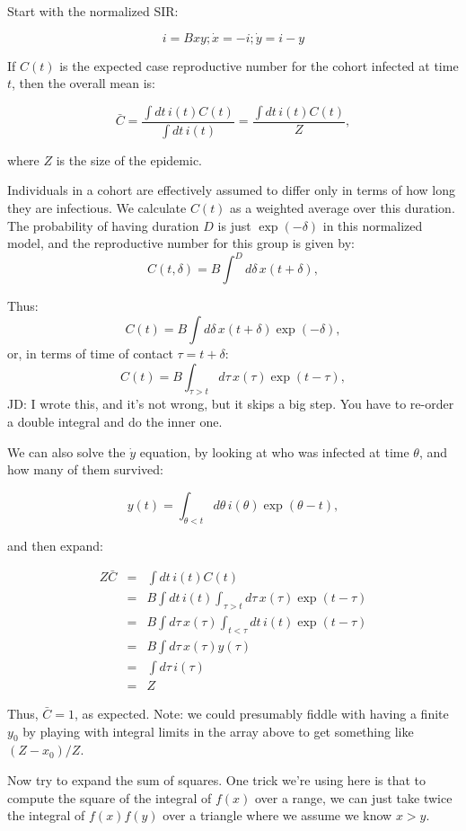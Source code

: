 \documentclass[12pt]{article}
\begin{document}
Start with the normalized SIR:

$$ i = Bxy; \dot x = -i; \dot y = i-y $$

If $C(t)$ is the expected case reproductive number for the cohort infected at time $t$, then the overall mean is:

$$
	\bar C
	= \frac{\int{dt\, i(t) C(t)}}{\int{dt\, i(t)}}
	= \frac{\int{dt\, i(t) C(t)}}{Z},
$$

where $Z$ is the size of the epidemic.

Individuals in a cohort are effectively assumed to differ only in terms of how long they are infectious. We calculate $C(t)$ as a weighted average over this duration. The probability of having duration $D$ is just $\exp(-\delta)$ in this normalized model, and the reproductive number for this group is given by:
$$C(t, \delta) = B \int^D{d\delta\, x(t+\delta)}, $$

Thus:
$$C(t) = B \int{d\delta\, x(t+\delta) \exp(-\delta)}, $$
or, in terms of time of contact $\tau=t+\delta$:
$$C(t) = B \int_{\tau>t}{d\tau\, x(\tau) \exp(t-\tau)}, $$
JD: I wrote this, and it's not wrong, but it skips a big step. You have to re-order a double integral and do the inner one.

We can also solve the $\dot y$ equation, by looking at who was infected at time $\theta$, and how many of them survived:

$$ y(t) = \int_{\theta<t}{d\theta\, i(\theta)\exp(\theta-t)},$$

and then expand:

\begin{eqnarray}
	Z \bar C
	&=& \int{dt\, i(t) C(t)}
	\\ &=& B \int{dt\, i(t) \int_{\tau>t}{d\tau\, x(\tau) \exp(t-\tau)}}
	\\ &=& B \int{d\tau\, x(\tau) \int_{t<\tau}dt\, i(t) \exp(t-\tau)}
	\\ &=& B \int{d\tau\, x(\tau) y(\tau)}
	\\ &=& \int{d\tau\, i(\tau)}
	\\ &=& Z
\end{eqnarray}

Thus, $\bar C = 1$, as expected. Note: we could presumably fiddle with having a finite $y_0$ by playing with integral limits in the array above to get something like $(Z-x_0)/Z$.

Now try to expand the sum of squares. One trick we're using here is that to compute the square of the integral of $f(x)$ over a range, we can just take twice the integral of $f(x)f(y)$ over a triangle where we assume we know $x>y$.
\end{document}
